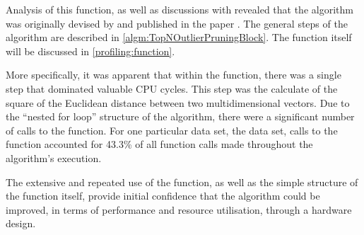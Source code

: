 Analysis of this function, as well as discussions with \citeauthor{Khoa:2012}
revealed that the algorithm was originally devised by \citeauthor{Bay:2003} and
published in the paper . The general steps of the algorithm
are described in \autoref{algm:TopNOutlierPruningBlock}. The function itself
will be discussed in \autoref{profiling:function}.

More specifically, it was apparent that within the
 function, there was a single step that
dominated valuable \gls{CPU} cycles. This step was the calculate of the square
of the Euclidean distance between two multidimensional vectors. Due to the
``nested for loop'' structure of the algorithm, there were a significant number
of calls to the  function. For one particular data
set, the  data set, calls to the 
function accounted for 43.3\% of all function calls made throughout the
algorithm's execution.

The extensive and repeated use of the  function, as
well as the simple structure of the function itself, provide initial confidence
that the  algorithm could be
improved, in terms of performance and resource utilisation, through a hardware
design.